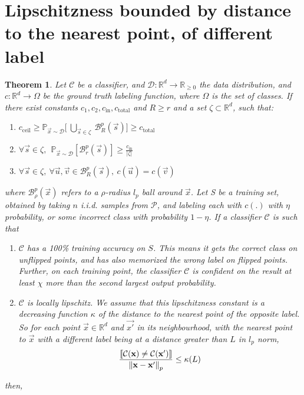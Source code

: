 \documentclass[12pt, oneside]{book}
\newtheorem{theorem}{Theorem}
\begin{document}
\section{Lipschitzness bounded by distance to the nearest point, of different label}
\begin{theorem}
    \label{theorem:lipschitzness-extension-closest-one}
    Let $\mathcal{C}$ be a classifier, and $\mathcal{D}: \mathbb{R}^d \to
    \mathbb{R}_{\geq 0}$ the data distribution, and $c: \mathbb{R}^d \to \Omega$
    be the ground truth labeling function, where $\Omega$ is the set of classes.
    If there exist constants $c_1, c_2, c_{\text{in}}, c_{\text{total}}$ and $R
    \geq r$ and a set $\zeta \subset \mathbb{R}^d$, such that:
    \begin{enumerate}
        \item $c_{\text{ceil}} \geq \mathbb{P}_{\vec{x} \sim \mathcal{D}} \bigg
        [~\underset{\vec{s} \in \zeta}{\bigcup}~\mathcal{B}_R^p(\vec{s}) \bigg ]
        \geq c_{\text{total}}$
        \item $\forall \vec{s} \in \zeta,~~ \mathbb{P}_{\vec{x} \sim
        \mathcal{D}} [\mathcal{B}_r^p(\vec{s})] \geq
        \frac{c_{\text{in}}}{|\zeta|}$
        \item $\forall \vec{s} \in \zeta,~\forall \vec{u}, \vec{v} \in
        \mathcal{B}_R^p(\vec{s}),~c(\vec{u}) = c(\vec{v})$
    \end{enumerate}
    where $\mathcal{B}^p_\rho(\vec{x})$ refers to a $\rho$-radius $l_p$ ball
    around $\vec{x}$. Let S be a training set, obtained by taking $n$ i.i.d.
    samples from $\mathcal{P}$, and labeling each with $c(.)$ with $\eta$
    probability, or some incorrect class with probability $1-\eta$. If a
    classifier $\mathcal{C}$ is such that
    \begin{enumerate}
        \item $\mathcal{C}$ has a 100\% training accuracy on $S$. This means it
        gets the correct class on unflipped points, and has also memorized the
        wrong label on flipped points. Further, on each training point, the
        classifier $\mathcal{C}$ is confident on the result at least $\chi$ more
        than the second largest output probability.
        \item $\mathcal{C}$ is locally lipschitz. We assume that this
        lipschitzness constant is a decreasing function $\kappa$ of the distance
        to the nearest point of the opposite label. So for each point $\vec{x}
        \in \mathbb{R}^d$ and $\vec{x'}$ in its neighbourhood, with the nearest
        point to $\vec{x}$ with a different label being at a distance greater
        than $L$ in $l_p$ norm,
            \begin{equation*}
                \frac{\llbracket \mathcal{C}({\mathbf{x}}) \neq \mathcal{C}({\mathbf{x'}}) \rrbracket}
                    {\mathrm{\left\lVert{\mathbf{x}} - {\mathbf{x'}}\right\rVert}_p} 
                \leq \kappa(L)
            \end{equation*}
    \end{enumerate}
    then,


\end{theorem}
\end{document}
